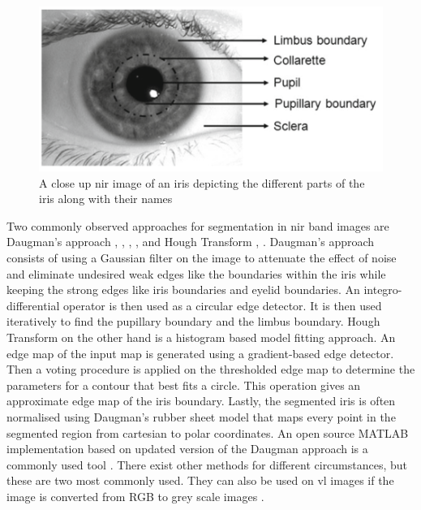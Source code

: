 \begin{figure}[H]
\centering
\includegraphics[width=\textwidth]{figures/iris_naming.png} 
\caption{A close up \gls{nir} image of an iris depicting the different parts of the iris along with their names \citep{Bowyer2016b}}
\label{fig:iris_naming}
\end{figure}

Two commonly observed approaches for segmentation in \gls{nir} band images are Daugman's approach \citep{Daugman1993} , \citep{Saha2017}, \citep{Rattani2017}, \citep{Khan2017a}, and Hough Transform \citep{Luhadiya2017}, \citep{Uka2017}. Daugman's approach consists of using a Gaussian filter on the image to attenuate the effect of noise and eliminate undesired weak edges like the boundaries within the iris while keeping the strong edges like iris boundaries and eyelid boundaries. An integro-differential operator is then used as a circular edge detector. It is then used iteratively to find the pupillary boundary and the limbus boundary. Hough Transform on the other hand is a histogram based model fitting approach. An edge map of the input map is generated using a gradient-based edge detector. Then a voting procedure is applied on the thresholded edge map to determine the parameters for a contour that best fits a circle. This operation gives an approximate edge map of the iris boundary. Lastly, the segmented iris is often normalised using Daugman's rubber sheet model that maps every point in the segmented region from cartesian to polar coordinates. An open source MATLAB implementation based on updated version of the Daugman approach is a commonly used tool \citep{Percy}. There exist other methods for different circumstances, but these are two most commonly used. They can also be used on \gls{vl} images if the image is converted from RGB to grey scale images \citep{Bowyer2016}. 

